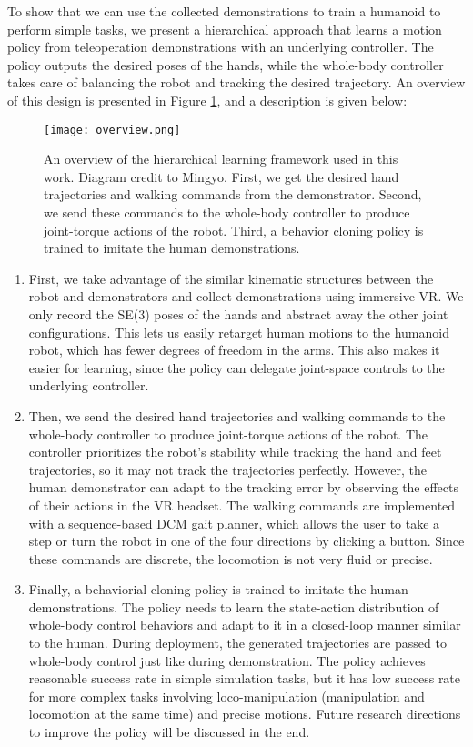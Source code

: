 To show that we can use the collected demonstrations to train a humanoid to perform simple tasks, we present a hierarchical approach that learns a motion policy from teleoperation demonstrations with an underlying controller. The policy outputs the desired poses of the hands, while the whole-body controller takes care of balancing the robot and tracking the desired trajectory. An overview of this design is presented in Figure \ref{fig:overview}, and a description is given below:
\begin{figure}
    \centering
    \texttt{[image: overview.png]}
    \caption{An overview of the hierarchical learning framework used in this work. Diagram credit to Mingyo. First, we get the desired hand trajectories and walking commands from the demonstrator. Second, we send these commands to the whole-body controller to produce joint-torque actions of the robot. Third, a behavior cloning policy is trained to imitate the human demonstrations. }
    \label{fig:overview}
\end{figure}
\begin{enumerate}
    \item First, we take advantage of the similar kinematic structures between the robot and demonstrators and collect demonstrations using immersive VR. 
We only record the SE(3) poses of the hands and abstract away the other joint configurations. This lets us easily retarget human motions to the humanoid robot, which has fewer degrees of freedom in the arms. This also makes it easier for learning, since the policy can delegate joint-space controls to the underlying controller. 
\item Then, we send the desired hand trajectories and walking commands to the whole-body controller to produce joint-torque actions of the robot. The controller prioritizes the robot's stability while tracking the hand and feet trajectories, so it may not track the trajectories perfectly. However, the human demonstrator can adapt to the tracking error by observing the effects of their actions in the VR headset. The walking commands are implemented with a sequence-based DCM gait planner, which allows the user to take a step or turn the robot in one of the four directions by clicking a button. Since these commands are discrete, the locomotion is not very fluid or precise. 
\item Finally, a behaviorial cloning policy is trained to imitate the human demonstrations. The policy needs to learn the state-action distribution of whole-body control behaviors and adapt to it in a closed-loop manner similar to the human. During deployment, the generated trajectories are passed to whole-body control just like during demonstration. The policy achieves reasonable success rate in simple simulation tasks, but it has low success rate for more complex tasks involving loco-manipulation (manipulation and locomotion at the same time) and precise motions. Future research directions to improve the policy will be discussed in the end. 
\end{enumerate}

